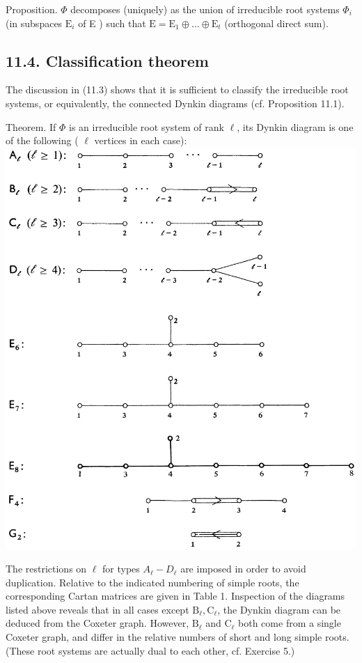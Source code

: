 \documentclass[10pt]{article}
\begin{document}
Proposition. $\Phi$ decomposes (uniquely) as the union of irreducible root systems $\Phi_{i}$ (in subspaces $\mathrm{E}_{i}$ of E ) such that $\mathrm{E}=\mathrm{E}_{1} \oplus \ldots \oplus \mathrm{E}_{t}$ (orthogonal direct sum).

\subsection*{11.4. Classification theorem}
The discussion in (11.3) shows that it is sufficient to classify the irreducible root systems, or equivalently, the connected Dynkin diagrams (cf. Proposition 11.1).

Theorem. If $\Phi$ is an irreducible root system of rank $\ell$, its Dynkin diagram is one of the following ( $\ell$ vertices in each case):\\
\includegraphics[max width=\textwidth, center]{2025_06_06_fac2836a92464059da43g-071}

The restrictions on $\ell$ for types $A_{\ell}-D_{\ell}$ are imposed in order to avoid duplication. Relative to the indicated numbering of simple roots, the corresponding Cartan matrices are given in Table 1. Inspection of the diagrams listed above reveals that in all cases except $\mathrm{B}_{\ell}, \mathrm{C}_{\ell}$, the Dynkin diagram can be deduced from the Coxeter graph. However, $\mathrm{B}_{\ell}$ and $\mathrm{C}_{\ell}$ both come from a single Coxeter graph, and differ in the relative numbers of short and long simple roots. (These root systems are actually dual to each other, cf. Exercise 5.)
\end{document}
